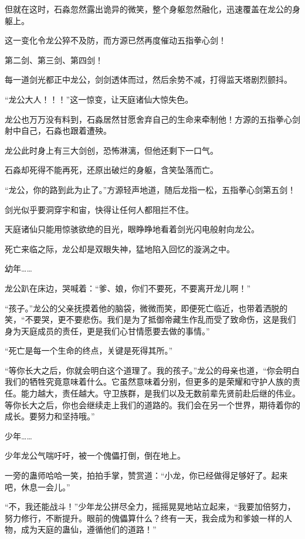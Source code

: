 \begin{this_body}
但就在这时，石淼忽然露出诡异的微笑，整个身躯忽然融化，迅速覆盖在龙公的身躯上。

这一变化令龙公猝不及防，而方源已然再度催动五指拳心剑！

第二剑、第三剑、第四剑！

每一道剑光都正中龙公，剑剑透体而过，然后余势不减，打得监天塔剧烈颤抖。

“龙公大人！！！”这一惊变，让天庭诸仙大惊失色。

龙公也万万没有料到，石淼居然甘愿舍弃自己的生命来牵制他！方源的五指拳心剑射中自己，石淼也跟着遭殃。

龙公此时身上有三大剑创，恐怖淋漓，但他还剩下一口气。

石淼却死得不能再死，还原出破烂的身躯，含笑坠落而亡。

“龙公，你的路到此为止了。”方源轻声地道，随后龙指一松，五指拳心剑第五剑！

剑光似乎要洞穿宇和宙，快得让任何人都阻拦不住。

天庭诸仙只能用惊骇欲绝的目光，眼睁睁地看着剑光闪电般射向龙公。

死亡来临之际，龙公却是双眼失神，猛地陷入回忆的漩涡之中。

幼年……

龙公趴在床边，哭喊着：“爹、娘，你们不要死，不要离开龙儿啊！”

“孩子。”龙公的父亲抚摸着他的脑袋，微微而笑，即便死亡临近，也带着洒脱的笑，“不要哭，更不要悲伤。我们是为了抵御帝藏生作乱而受了致命伤，这是我们身为天庭成员的责任，更是我们心甘情愿要去做的事情。”

“死亡是每一个生命的终点，关键是死得其所。”

“等你长大之后，你就会明白这个道理了。我的孩子。”龙公的母亲也道，“你会明白我们的牺牲究竟意味着什么。它虽然意味着分别，但更多的是荣耀和守护人族的责任。能力越大，责任越大。守卫族群，是我们以及无数前辈先贤前赴后继的伟业。等你长大之后，你也会继续走上我们的道路的。我们会在另一个世界，期待着你的成长。要努力和坚持哦。”

少年……

少年龙公气喘吁吁，被一个傀儡打倒，倒在地上。

一旁的蛊师哈哈一笑，拍拍手掌，赞赏道：“小龙，你已经做得足够好了。起来吧，休息一会儿。”

“不，我还能战斗！”少年龙公拼尽全力，摇摇晃晃地站立起来，“我要加倍努力，努力修行，不断提升。眼前的傀儡算什么？终有一天，我会成为和爹娘一样的人物，成为天庭的蛊仙，遵循他们的道路！”


\end{this_body}
